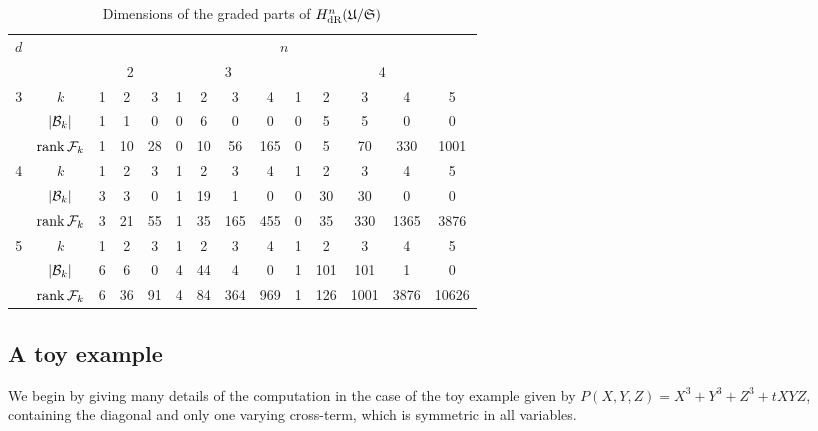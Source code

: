 \begin{table}[h!]
\begin{center}
\caption{Dimensions of the graded parts of $H_{\text{dR}}^n(\mathfrak{U}/\mathfrak{S})$}
\label{tab:01-04-Dimensions}
\vspace{2mm}
\begin{tabular}{@{}cccccccccccccc@{}} \toprule
\multirow{2}{*}{$d$} &                & \multicolumn{12}{c}{$n$} \\ \cmidrule(r){3-14}
                     &                & \multicolumn{3}{c}{2} & \multicolumn{4}{c}{3} & \multicolumn{5}{c}{4} \\ \midrule
\multirow{3}{*}{3}   & $k$            & 1 & 2 & 3             & 1 & 2 & 3 & 4         & 1 & 2 & 3 & 4 & 5 \\
                     & $\left\lvert\mathcal{B}_k\right\rvert$ & 1 & 1 & 0             & 0 & 6 & 0 & 0         & 0 & 5 & 5 & 0 & 0 \\
                     & $\operatorname{rank} \mathcal{F}_k$  & 1 & 10 & 28           & 0 & 10 & 56 & 165     & 0 & 5 & 70 & 330 & 1001 \\ \midrule
\multirow{3}{*}{4}   & $k$            & 1 & 2 & 3             & 1 & 2 & 3 & 4         & 1 & 2 & 3 & 4 & 5 \\
                     & $\left\lvert\mathcal{B}_k\right\rvert$ & 3 & 3 & 0             & 1 & 19 & 1 & 0        & 0 & 30 & 30 & 0 & 0 \\
                     & $\operatorname{rank} \mathcal{F}_k$  & 3 & 21 & 55           & 1 & 35 & 165 & 455    & 0 & 35 & 330 & 1365 & 3876 \\ \midrule
\multirow{3}{*}{5}   & $k$            & 1 & 2 & 3             & 1 & 2 & 3 & 4         & 1 & 2 & 3 & 4 & 5 \\
                     & $\left\lvert\mathcal{B}_k\right\rvert$ & 6 & 6 & 0             & 4 & 44 & 4 & 0        & 1 & 101 & 101 & 1 & 0 \\
                     & $\operatorname{rank} \mathcal{F}_k$  & 6 & 36 & 91           & 4 & 84 & 364 & 969    & 1 & 126 & 1001 & 3876 & 10626 \\ \bottomrule
\end{tabular}
\end{center}
\end{table}

\subsection{A toy example}

We begin by giving many details of the computation in the case of the toy 
example given by $P(X,Y,Z) = X^3 + Y^3 + Z^3 + t XYZ$, containing the 
diagonal and only one varying cross-term, which is symmetric in all 
variables.

